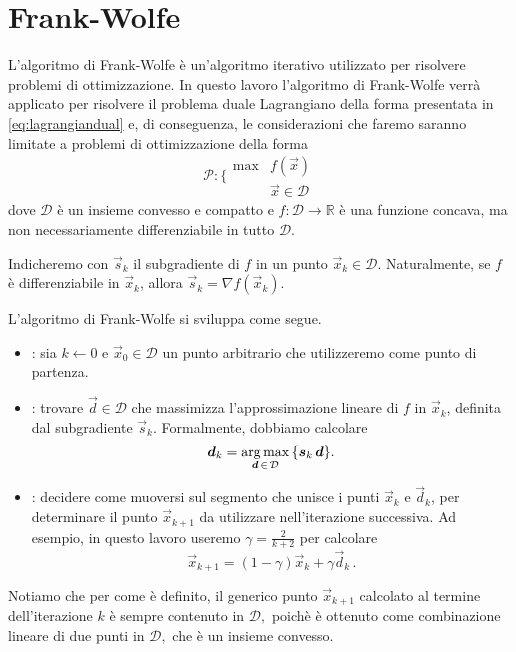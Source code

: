 \section{Frank-Wolfe}\label{sec:fw}
L'algoritmo di Frank-Wolfe è un'algoritmo iterativo utilizzato per risolvere problemi di ottimizzazione. In questo
lavoro l'algoritmo di Frank-Wolfe verrà applicato per risolvere il problema duale Lagrangiano della forma presentata in
\eqref{eq:lagrangiandual} e, di conseguenza, le considerazioni che faremo saranno limitate a problemi di ottimizzazione
della forma
\begin{equation}
    \mathcal{P}\colon \bigg\{
    \begin{array}{ll}
        \max & f(\vec{x}) \\
             & \vec{x} \in \mathcal{D}
    \end{array}
\end{equation}
dove \( \mathcal{D} \) è un insieme convesso e compatto e \( f\colon \mathcal{D} \to \mathbb{R} \) è una funzione
concava, ma non necessariamente differenziabile in tutto \( \mathcal{D} \).

Indicheremo con \( \vec{s}_k \) il subgradiente di \( f \) in un punto \( \vec{x}_k \in \mathcal{D} \). Naturalmente, se
\( f \) è differenziabile in \( \vec{x}_k \), allora \( \vec{s}_k = \nabla f(\vec{x}_k) \).

L'algoritmo di Frank-Wolfe si sviluppa come segue.

\begin{itemize}
    \item {}: sia \( k \gets 0 \) e \( \vec{x}_0 \in \mathcal{D} \) un punto arbitrario che
        utilizzeremo come punto di partenza.

    \item {}: trovare \( \vec{d} \in \mathcal{D} \) che massimizza l'approssimazione lineare di \( f
        \) in \( \vec{x}_k \), definita dal subgradiente \( \vec{s}_k \). Formalmente,
        dobbiamo calcolare
        \[
            \bm{d}_k = \operatorname*{arg\,max}_{\bm{d} \,\in\, \mathcal{D}} \, \{\bm{s}_k\, \bm{d}\}.
        \]
    \item {}: decidere come muoversi sul segmento che unisce i punti \(
        \vec{x}_k \) e \( \vec{d}_k \), per determinare il punto \( \vec{x}_{k+1} \) da utilizzare nell'iterazione
        successiva. Ad esempio, in questo lavoro useremo \( \gamma = \frac{2}{k+2} \) per calcolare
        \[
            \vec{x}_{k+1} = (1 - \gamma)\vec{x}_k + \gamma\vec{d}_k\,.
        \]
\end{itemize}
Notiamo che per come è definito, il generico punto \( \vec{x}_{k+1} \) calcolato al termine dell'iterazione \( k \) è
sempre contenuto in
\(
    \mathcal{D},
\)
poichè è ottenuto come combinazione lineare di due punti in
\(
    \mathcal{D},
\)
che è un insieme convesso.

